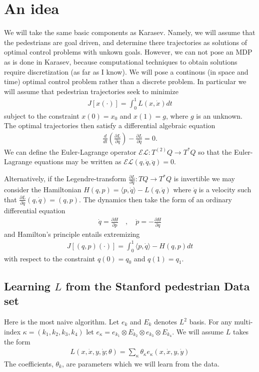 \documentclass[12pt]{amsart}
\newcommand{\pder}[2]{\ensuremath{\frac{ \partial #1}{\partial #2}}}
\begin{document}
\section{An idea}
We will take the same basic components as Karasev.
Namely, we will assume that the pedestrians are goal driven, and determine there trajectories as solutions of optimal control problems with unkown goals.
However, we can not pose an MDP as is done in Karasev, because computational techniques to obtain solutions require discretization (as far as I know).
We will pose a continous (in space and time) optimal control problem rather than a discrete problem.
In particular we will assume that pedestrian trajectories seek to minimize
\begin{align*}
    J[x(\cdot) ] = \int_0^1 L(x,\dot{x}) dt
\end{align*}
subject to the constraint $x(0) = x_0$ and $x(1) = g$, where $g$ is an unknown.
The optimal trajectories then satisfy a differential algebraic equation
\begin{align*}
    \frac{d}{dt} \left( \pder{L}{\dot{q}} \right) - \pder{L}{q} = 0.
\end{align*}
We can define the Euler-Lagrange operator $\mathcal{EL}: T^{(2)}Q \to T^*Q$ so that the Euler-Lagrange equations may be written as $\mathcal{EL}(q,\dot{q},\ddot{q}) = 0$.

Alternatively, if the Legendre-transform $\pder{L}{\dot{q}} : TQ \to T^*Q$ is invertible we may consider the Hamiltonian $H(q,p) = \langle p , \dot{q} \rangle - L(q,\dot{q})$ where $\dot{q}$ is a velocity such that $\pder{L}{\dot{q}}(q,\dot{q}) = (q,p)$.
The dynamics then take the form of an ordinary differential equation
\begin{align*}
	\dot{q} = \pder{H}{p} \quad,\quad \dot{p} = - \pder{H}{q}
\end{align*}
and Hamilton's principle entails extremizing
\begin{align*}
	J[ (q,p)(\cdot) ] = \int_0^1 \langle p , \dot{q} \rangle - H(q,p) dt
\end{align*}
with respect to the constraint $q(0) = q_0$ and $q(1) = q_1$.


\subsection{Learning $L$ from the Stanford pedestrian Data set}
Here is the most naive algorithm.  Let $e_k$ and $E_k$ denotes $L^2$ basis.
For any multi-index $\kappa = (k_1,k_2,k_3,k_4)$ let $e_\kappa = e_{k_1} \otimes E_{k_2} \otimes e_{k_3} \otimes E_{k_4}$.
We will assume $L$ takes the form
\begin{align*}
	L(x,\dot{x},y,\dot{y} ; \theta) = \sum_\kappa \theta_\kappa e_\kappa(x,\dot{x},y,\dot{y})
\end{align*}
The coefficients, $\theta_k$, are parameters which we will learn from the data.
\end{document}
